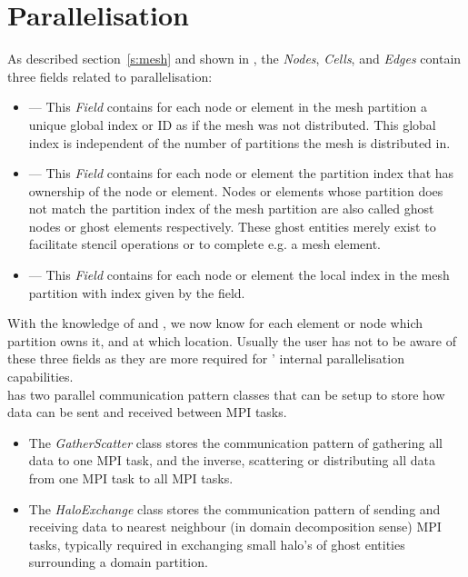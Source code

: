 \section{Parallelisation} \label{s:parallelisation}
%
As described section~\ref{s:mesh} and shown in , the \emph{Nodes},
\emph{Cells}, and \emph{Edges} contain three fields related to parallelisation:
\begin{itemize}
  \item {} --- This \emph{Field} contains for each
        node or element in the mesh partition a unique global index
        or ID as if the mesh was not distributed. 
        This global index is independent of the number of partitions
        the mesh is distributed in.
  \item {} --- This \emph{Field} contains for each node
        or element the partition index that has ownership of the node
        or element. Nodes or elements whose partition does not match
        the partition index of the mesh partition are also called
        ghost nodes or ghost elements respectively. These ghost entities
        merely exist to facilitate stencil operations or to complete
        e.g. a mesh element.
   \item {} --- This \emph{Field} contains for each
        node or element the local index in the mesh partition with index
        given by the  field.
\end{itemize}
With the knowledge of  and , we now
know for each element or node which partition owns it, and at which location.
Usually the user has not to be aware of these three fields as they are
more required for \Atlas' internal parallelisation capabilities.\\
%
\Atlas has two parallel communication pattern classes that can be setup to
store how data can be sent and received between MPI tasks.
\begin{itemize}
\item The \emph{GatherScatter} class stores the communication pattern of 
gathering all data to one MPI task, and the inverse, scattering or distributing 
all data from one MPI task to all MPI tasks.
\item The \emph{HaloExchange} class stores the communication pattern of sending 
and receiving data to nearest neighbour (in domain decomposition sense) MPI 
tasks, typically required in exchanging small halo's of ghost entities 
surrounding a domain partition.
\end{itemize}
%

